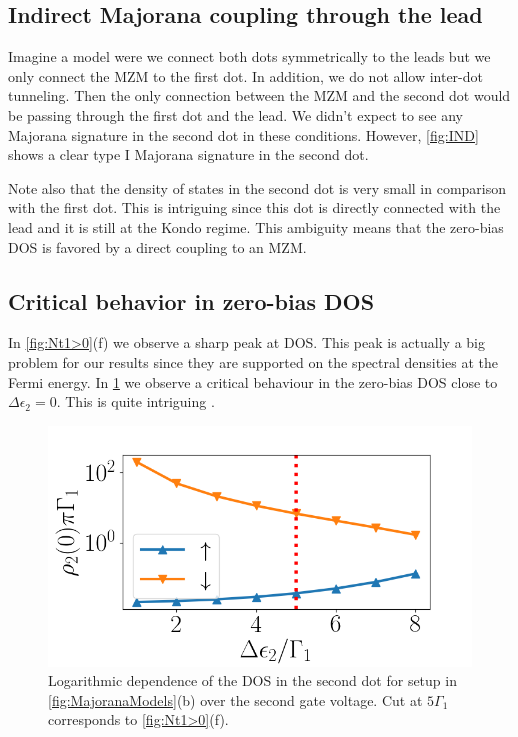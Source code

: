 \subsection{Indirect Majorana coupling through the lead}

Imagine a model were we connect both dots symmetrically to the leads but we only connect the MZM to the first dot. In addition, we do not allow inter-dot tunneling. Then the only connection between the MZM and the second dot would be passing through the first dot and  the lead. We didn't expect to see any Majorana signature in the second dot in these conditions. However, \ref{fig:IND} shows a clear type I Majorana signature in the second dot.




 Note also that the density of states in the second dot is very small in comparison with the first dot. This is intriguing since this dot is directly connected with the lead and it is still at the Kondo regime. This ambiguity means that the zero-bias DOS is favored by a direct coupling to an MZM.  

\subsection{Critical behavior in  zero-bias DOS }

In \ref{fig:Nt1>0}(f) we observe a sharp peak at DOS. This peak is actually a big problem for our results since they are  supported on the spectral densities at the Fermi energy. In \ref{fig:Critical} we observe a critical behaviour in the zero-bias DOS close to $\Delta\epsilon_2 =0$. This is quite intriguing . 


\begin{figure}[t]
\centering
\includegraphics[scale=0.6]{IMAGES/NRG/Critical.png}
\caption{\label{fig:Critical} Logarithmic dependence of the DOS in the second dot for setup in \ref{fig:MajoranaModels}(b) over the second gate voltage. Cut at $5\Gamma_1$ corresponds to \ref{fig:Nt1>0}(f). \protect\Source{} }
\end{figure} 

